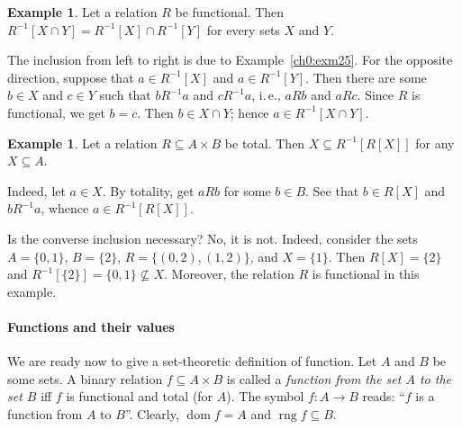 \documentclass[12pt,notitlepage]{article}
\theoremstyle{plain}
\theoremstyle{definition}
\newtheorem{exm}[thm]{Example}
\theoremstyle{plain}
\newcommand{\sbs}{\subseteq}
\newcommand{\dom}{\mathop{\mathrm{dom}}}
\newcommand{\rng}{\mathop{\mathrm{rng}}}
\newcommand{\1}{\mathbf{1}}
\newcommand{\0}{\mathbf{0}}
\begin{document}
\begin{exm}
Let a relation $R$ be functional. Then $R^{-1}[X \cap Y] = R^{-1}[X] \cap R^{-1}[Y]$ for every sets $X$ and $Y$.

The inclusion from left to right is due to Example~\ref{ch0:exm25}. For the opposite direction, suppose that $a \in R^{-1}[X]$ and $a \in R^{-1}[Y]$. Then there are some $b \in X$ and $c \in Y$ such that $bR^{-1}a$ and $cR^{-1}a$, i.\,e., $a R b$ and $a R c$. Since $R$ is functional, we get $b = c$. Then $b \in X \cap Y$; hence $a \in R^{-1}[X \cap Y]$.
\end{exm}

\begin{exm}
Let a relation $R \sbs A \times B$ be total. Then $X \sbs R^{-1}[R[X]]$ for any $X \sbs A$.

Indeed, let $a \in X$. By totality, get $a R b$ for some $b \in B$. See that $b \in R[X]$ and $b R^{-1} a$, whence $a \in R^{-1}[R[X]]$.

Is the converse inclusion necessary? No, it is not. Indeed, consider the sets $A = \{0,1\}$, $B = \{2\}$, $R = \{(0,2), (1,2)\}$, and $X = \{1\}$. Then $R[X] = \{2\}$ and $R^{-1}[\{2\}] = \{0,1\} \not\sbs X$. Moreover, the relation $R$ is functional in this example.
\end{exm}

\paragraph{Functions and their values} We are ready now to give a set-theoretic definition of function. Let  $A$ and $B$ be some sets. A binary relation $f \sbs A \times B$ is called a \emph{function from the set $A$ to the set $B$} iff $f$ is functional and total (for $A$). The symbol $f\colon A \to B$ reads: ``$f$ is a function from $A$ to $B$''. Clearly, $\dom f = A$ and $\rng f \sbs B$.
\end{document}
